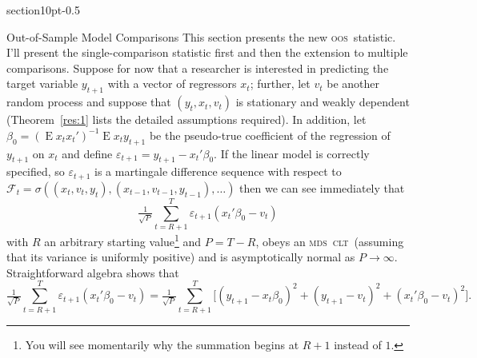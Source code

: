 \documentclass[10pt,fleqn,draft]{article}
\makeatletter
\renewcommand\section{\@startsection%
{section}{1}{0pt}{-\baselineskip}{0.5\baselineskip}%
{\normalfont\normalsize\bfseries\large\raggedright}}
\theoremstyle{definition}
\DeclareMathOperator{\E}{E}
\newcommand{\clt}{\textsc{clt}}
\newcommand{\mds}{\textsc{mds}}
\newcommand{\oos}{\textsc{oos}}
\makeatother
\begin{document}
\section{Out-of-Sample Model Comparisons}\label{sec:1}
This section presents the new \oos\ statistic.  I'll present the
single-comparison statistic first and then the extension to multiple
comparisons.  Suppose for now that a researcher is interested in
predicting the target variable $y_{t+1}$ with a vector of regressors
$x_t$; further, let $v_t$ be another random process and suppose that
$(y_t, x_t, v_t)$ is stationary and weakly dependent
(Theorem~\ref{res:1} lists the detailed assumptions required).  In
addition, let $\beta_0 = (\E x_t x_t')^{-1} \E x_t y_{t+1}$ be the
pseudo-true coefficient of the regression of $y_{t+1}$ on $x_t$ and
define $\varepsilon_{t+1} = y_{t+1} - x_t'\beta_0$.  If the linear
model is correctly specified, so $\varepsilon_{t+1}$ is a martingale
difference sequence with respect to $\mathcal{F}_t = \sigma((x_t, v_t,
y_t), (x_{t-1}, v_{t-1}, y_{t-1}),\dots)$ then we can see immediately that
\begin{equation}
  \label{eq:4}
  \tfrac{1}{\sqrt{P}} \sum_{t=R+1}^T \varepsilon_{t+1} (x_t'\beta_0
  - v_t) 
\end{equation}
with $R$ an arbitrary starting value\footnote{You will see momentarily
  why the summation begins at $R+1$ instead of $1$.} and $P = T - R$,
obeys an \mds\ \clt\ (assuming that its variance is uniformly
positive) and is asymptotically normal as $P \to \infty$.
Straightforward algebra \citep{ClW:07} shows that
\begin{equation}
  \label{eq:5}
  \tfrac{1}{\sqrt{P}} \sum_{t=R+1}^T \varepsilon_{t+1} (x_t'\beta_0
  - v_t) = \tfrac{1}{\sqrt{P}} \sum_{t=R+1}^T \Big[(y_{t+1} -
  x_t\beta_0)^2 + (y_{t+1} - v_t)^2 + (x_t'\beta_0 - v_t)^2 \Big].
\end{equation}
\end{document}
